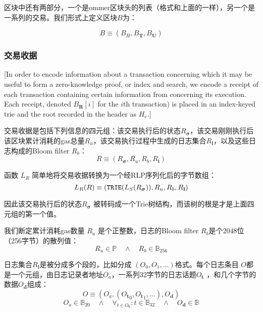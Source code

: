 \documentclass[UTF8,nofonts]{ctexart}
\begin{document}
\begin{multicols}{2}
区块中还有两部分，一个是ommer区块头的列表（格式和上面的一样），另一个是一系列的交易。我们形式上定义区块$B$为：

\begin{equation}
B \equiv (B_H, B_\mathbf{T}, B_\mathbf{U})
\end{equation}

\subsubsection{交易收据}

[In order to encode information about a transaction concerning which it may be useful to form a zero-knowledge proof, or index and search, we encode a receipt of each transaction containing certain information from concerning its execution. Each receipt, denoted $B_\mathbf{R}[i]$ for the $i$th transaction) is placed in an index-keyed trie and the root recorded in the header as $H_e$.]

交易收据是包括下列信息的四元组：该交易执行后的状态$R_{\boldsymbol{\sigma}}$，该交易刚刚执行后该区块累计消耗的gas总量$R_u$，该交易执行过程中生成的日志集合$R_\mathbf{l}$，以及这些日志构成的Bloom filter $R_b$：
\begin{equation}
R \equiv (R_{\boldsymbol{\sigma}}, R_u, R_b, R_\mathbf{l})
\end{equation}

函数 $L_R$ 简单地将交易收据转换为一个经RLP序列化后的字节数组：
\begin{equation}
L_R(R) \equiv (\mathtt{\small TRIE}(L_S(R_{\boldsymbol{\sigma}})), R_u, R_b, R_\mathbf{l})
\end{equation}

因此该交易执行后的状态$R_{\boldsymbol{\sigma}}$ 被转码成一个Trie树结构，而该树的根是才是上面四元组的第一个值。

我们断定累计消耗gas数量 $R_u$ 是个正整数，日志的Bloom filter $R_b$是个2048位（256字节）的散列值：
\begin{equation}
R_u \in \mathbb{P} \quad \wedge \quad R_b \in \mathbb{B}_{256}
\end{equation}


日志集合$R_\mathbf{l}$是被分成多个段的，比如分成 $(O_0, O_1, ...)$格式。每个日志条目 $O$都是一个元组，由日志记录者地址$O_a$，一系列32字节的日志话题$O_\mathbf{t}$ ，和几个字节的数据$O_\mathbf{d}$组成：
\begin{equation}
O \equiv (O_a, ({O_\mathbf{t}}_0, {O_\mathbf{t}}_1, ...), O_\mathbf{d})
\end{equation}
\begin{equation}
O_a \in \mathbb{B}_{20} \quad \wedge \quad \forall_{t \in O_\mathbf{t}}: t \in \mathbb{B}_{32} \quad \wedge \quad O_\mathbf{d} \in \mathbb{B}
\end{equation}


\end{multicols}
\end{document}
